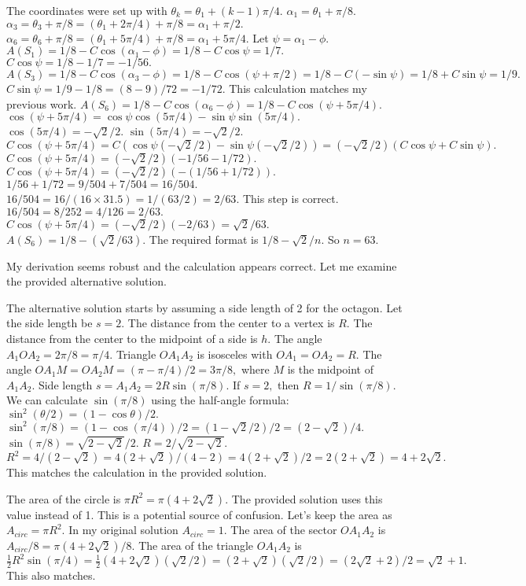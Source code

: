 The coordinates were set up with $\theta_k = \theta_1 + (k-1)\pi/4.$ 
$\alpha_1 = \theta_1 + \pi/8.$ 
$\alpha_3 = \theta_3 + \pi/8 = (\theta_1 + 2\pi/4) + \pi/8 = \alpha_1 + \pi/2.$ 
$\alpha_6 = \theta_6 + \pi/8 = (\theta_1 + 5\pi/4) + \pi/8 = \alpha_1 + 5\pi/4.$ 
Let $\psi = \alpha_1 - \phi.$ 
$A(S_1) = 1/8 - C \cos(\alpha_1 - \phi) = 1/8 - C \cos \psi = 1/7.$ 
$C \cos \psi = 1/8 - 1/7 = -1/56.$ 
$A(S_3) = 1/8 - C \cos(\alpha_3 - \phi) = 1/8 - C \cos(\psi + \pi/2) = 1/8 - C(-\sin \psi) = 1/8 + C \sin \psi = 1/9.$ 
$C \sin \psi = 1/9 - 1/8 = (8-9)/72 = -1/72.$ 
This calculation matches my previous work. 
$A(S_6) = 1/8 - C \cos(\alpha_6 - \phi) = 1/8 - C \cos(\psi + 5\pi/4).$ 
$\cos(\psi + 5\pi/4) = \cos \psi \cos(5\pi/4) - \sin \psi \sin(5\pi/4).$ 
$\cos(5\pi/4) = -\sqrt{2}/2.$ $\sin(5\pi/4) = -\sqrt{2}/2.$ 
$C \cos(\psi + 5\pi/4) = C(\cos \psi (-\sqrt{2}/2) - \sin \psi (-\sqrt{2}/2)) = (-\sqrt{2}/2) (C \cos \psi + C \sin \psi).$ 
$C \cos(\psi + 5\pi/4) = (-\sqrt{2}/2) (-1/56 - 1/72).$ 
$C \cos(\psi + 5\pi/4) = (-\sqrt{2}/2) (-(1/56 + 1/72)).$ 
$1/56 + 1/72 = 9/504 + 7/504 = 16/504.$ 
$16/504 = 16/(16 \times 31.5) = 1/(63/2) = 2/63.$ This step is correct. $16/504 = 8/252 = 4/126 = 2/63.$ 
$C \cos(\psi + 5\pi/4) = (-\sqrt{2}/2) (-2/63) = \sqrt{2}/63.$ 
$A(S_6) = 1/8 - (\sqrt{2}/63).$ 
The required format is $1/8 - \sqrt{2}/n.$ 
So $n=63.$

My derivation seems robust and the calculation appears correct. Let me examine the provided alternative solution.

The alternative solution starts by assuming a side length of 2 for the octagon. Let the side length be $s=2.$ 
The distance from the center to a vertex is $R.$ The distance from the center to the midpoint of a side is $h.$ The angle $A_1OA_2 = 2\pi/8 = \pi/4.$ Triangle $OA_1A_2$ is isosceles with $OA_1 = OA_2 = R.$ The angle $OA_1M = OA_2M = (\pi - \pi/4)/2 = 3\pi/8,$ where $M$ is the midpoint of $A_1A_2.$ 
Side length $s = A_1A_2 = 2 R \sin(\pi/8).$ 
If $s=2,$ then $R = 1/\sin(\pi/8).$ 
We can calculate $\sin(\pi/8)$ using the half-angle formula: $\sin^2(\theta/2) = (1-\cos\theta)/2.$ 
$\sin^2(\pi/8) = (1-\cos(\pi/4))/2 = (1-\sqrt{2}/2)/2 = (2-\sqrt{2})/4.$ 
$\sin(\pi/8) = \sqrt{2-\sqrt{2}}/2.$ 
$R = 2/\sqrt{2-\sqrt{2}}.$ 
$R^2 = 4 / (2-\sqrt{2}) = 4(2+\sqrt{2}) / (4-2) = 4(2+\sqrt{2}) / 2 = 2(2+\sqrt{2}) = 4+2\sqrt{2}.$ This matches the calculation in the provided solution.

The area of the circle is $\pi R^2 = \pi (4+2\sqrt{2}).$ The provided solution uses this value instead of 1. This is a potential source of confusion. Let's keep the area as $A_{circ} = \pi R^2.$ In my original solution $A_{circ}=1.$ 
The area of the sector $OA_1A_2$ is $A_{circ}/8 = \pi(4+2\sqrt{2})/8.$ 
The area of the triangle $OA_1A_2$ is $\frac{1}{2} R^2 \sin(\pi/4) = \frac{1}{2} (4+2\sqrt{2}) (\sqrt{2}/2) = (2+\sqrt{2}) (\sqrt{2}/2) = (2\sqrt{2}+2)/2 = \sqrt{2}+1.$ This also matches.

